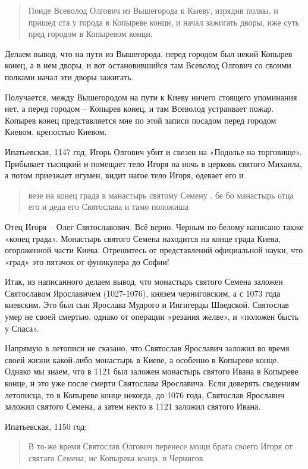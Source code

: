 \begin{quotation}
Поиде Всеволод Олгович из Вышегорода к Кыеву, изрядив полкы, и пришед ста у города в Копыреве конци, и начал зажигать дворы, иже суть пред городом в Копыревом конци.\end{quotation}

Делаем вывод, что на пути из Вышегорода, перед городом был некий Копырев конец, а в нем дворы, и вот остановившийся там Всеволод Олгович со своими полками начал эти дворы зажигать.

Получается, между Вышегородом на пути к Киеву ничего стоящего упоминания нет, а перед городом – Копырев конец, и там Всеволод устраивает пожар. Копырев конец представляется мне по этой записи посадом перед городом Киевом, крепостью Киевом.

Ипатьевская, 1147 год, Игорь Олгович убит и свезен на «Подолье на торговище». Прибывает тысяцкий и помещает тело Игоря на ночь в церковь святого Михаила, а потом приезжает игумен, видит нагое тело Игоря, одевает его и 

\begin{quotation}
везе на конец града в манастырь святому 
Семену . бе бо манастырь отца его и деда его Святослава и тамо положиша
\end{quotation}

Отец Игоря – Олег Святославович. Всё верно. Черным по-белому написано также «конец града». Монастырь святого Семена находится на конце града Киева, огороженной части Киева. Отрешитесь от представлений официальной науки, что «град» это пятачок от фуникулера до Софии!

Итак, из написанного делаем вывод, что монастырь святого Семена заложен Святославом Ярославичем (1027-1076), князем черниговским, а с 1073 года киевским. Это был сын Ярослава Мудрого и Ингигерды Шведской. Святослав умер не своей смертью, однако от операции «резания желве», и «положен бысть у Спаса».

Напрямую в летописи не сказано, что Святослав Ярославич заложил во время своей жизни какой-либо монастырь в Киеве, а особенно в Копыреве конце. Однако мы знаем, что в 1121 был заложен монастырь святого Ивана в Копыреве конце, и это уже после смерти Святослава Ярославича. Если доверять сведениям летописца, то в Копыреве конце некогда, до 1076 года, Святослав Ярославич заложил святого Семена, а затем некто в 1121 заложил святого Ивана.

Ипатьевская, 1150 год:

\begin{quotation}
В то-же время Святослав Олгович перенесе мощи брата своего Игоря от святаго Семена, ис Копырева конца, в Чернигов 
\end{quotation}

